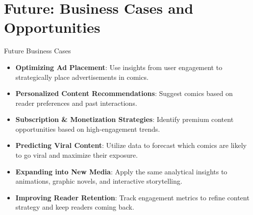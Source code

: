 \documentclass{beamer}
\begin{document}
\section{Future: Business Cases and Opportunities}
\begin{frame}{Future Business Cases}
    \begin{itemize}
        \item \textbf{Optimizing Ad Placement}: Use insights from user engagement to strategically place advertisements in comics.
        \item \textbf{Personalized Content Recommendations}: Suggest comics based on reader preferences and past interactions.
        \item \textbf{Subscription \& Monetization Strategies}: Identify premium content opportunities based on high-engagement trends.
        \item \textbf{Predicting Viral Content}: Utilize data to forecast which comics are likely to go viral and maximize their exposure.
        \item \textbf{Expanding into New Media}: Apply the same analytical insights to animations, graphic novels, and interactive storytelling.
        \item \textbf{Improving Reader Retention}: Track engagement metrics to refine content strategy and keep readers coming back.
    \end{itemize}
\end{frame}
\end{document}
